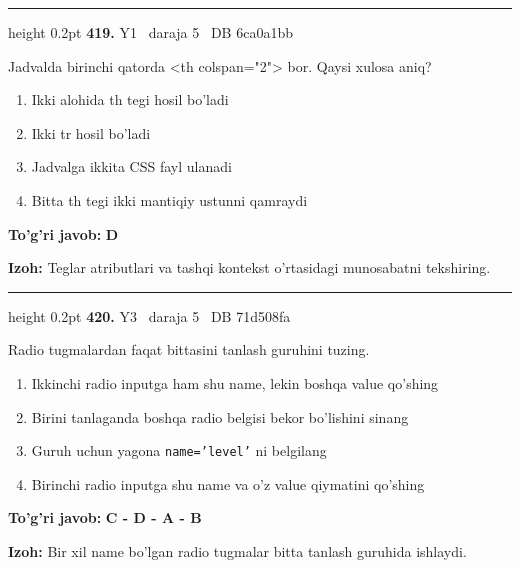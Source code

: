 \documentclass[10pt,a4paper,oneside]{article}
\begin{document}
\vspace{2mm}\hrule height 0.2pt \vspace{4mm}
\hypertarget{q419}{\textbf{\color{ink}419.}}  {\color{muted}\scriptsize Y1 \textbullet\ daraja 5 \textbullet\ DB 6ca0a1bb}
\par
Jadvalda birinchi qatorda \textless{}th colspan="2"\textgreater{} bor. Qaysi xulosa aniq?
\begin{enumerate}[label=\Alph*),leftmargin=9mm]
\item Ikki alohida th tegi hosil bo'ladi
\item Ikki tr hosil bo'ladi
\item Jadvalga ikkita CSS fayl ulanadi
\item Bitta th tegi ikki mantiqiy ustunni qamraydi
\end{enumerate}
\begin{tcolorbox}[enhanced,breakable,colback=teal!4,colframe=teal!45!black,boxrule=0.45pt,arc=1.2mm,left=2.8mm,right=2.8mm,top=2mm,bottom=2mm,before skip=2mm,after skip=2mm]
\textbf{\color{teal}To'g'ri javob:} \textbf{D}
\par\smallskip
\textbf{Izoh:} Teglar atributlari va tashqi kontekst o'rtasidagi munosabatni tekshiring.
\end{tcolorbox}
\vspace{2mm}\hrule height 0.2pt \vspace{4mm}
\hypertarget{q420}{\textbf{\color{ink}420.}}  {\color{muted}\scriptsize Y3 \textbullet\ daraja 5 \textbullet\ DB 71d508fa}
\par
Radio tugmalardan faqat bittasini tanlash guruhini tuzing.
\begin{enumerate}[label=\Alph*),leftmargin=9mm]
\item Ikkinchi radio inputga ham shu name, lekin boshqa value qo'shing
\item Birini tanlaganda boshqa radio belgisi bekor bo'lishini sinang
\item Guruh uchun yagona \texttt{name='level'} ni belgilang
\item Birinchi radio inputga shu name va o'z value qiymatini qo'shing
\end{enumerate}
\begin{tcolorbox}[enhanced,breakable,colback=teal!4,colframe=teal!45!black,boxrule=0.45pt,arc=1.2mm,left=2.8mm,right=2.8mm,top=2mm,bottom=2mm,before skip=2mm,after skip=2mm]
\textbf{\color{teal}To'g'ri javob:} \textbf{C - D - A - B}
\par\smallskip
\textbf{Izoh:} Bir xil name bo'lgan radio tugmalar bitta tanlash guruhida ishlaydi.
\end{tcolorbox}
\end{document}

